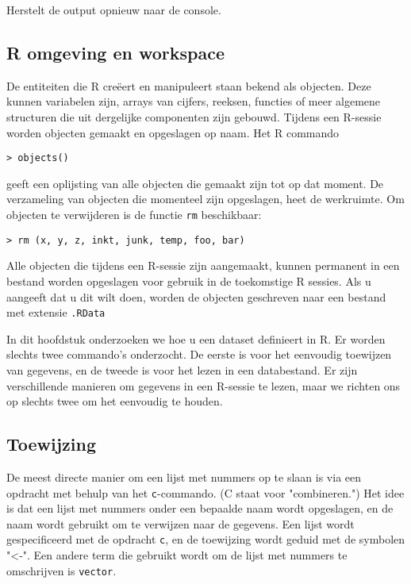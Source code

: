 Herstelt de output opnieuw naar de console.

\subsection{R omgeving en workspace}

De entiteiten die R creëert en manipuleert staan bekend als objecten. Deze kunnen variabelen zijn, arrays
van cijfers, reeksen, functies of meer algemene structuren die uit dergelijke componenten zijn gebouwd.
Tijdens een R-sessie worden objecten gemaakt en opgeslagen op naam. Het R commando

\begin{lstlisting}
> objects()
\end{lstlisting}

geeft een oplijsting van alle objecten die gemaakt zijn tot op dat moment.
De verzameling van objecten die momenteel zijn opgeslagen, heet de werkruimte.
Om objecten te verwijderen is de functie \texttt{rm} beschikbaar:

\begin{lstlisting}
> rm (x, y, z, inkt, junk, temp, foo, bar)
\end{lstlisting}

Alle objecten die tijdens een R-sessie zijn aangemaakt, kunnen permanent in een bestand worden opgeslagen voor gebruik in de toekomstige
R sessies. Als u aangeeft dat u dit wilt doen, worden de objecten geschreven naar een bestand met extensie \texttt{.RData}

In dit hoofdstuk onderzoeken we hoe u een dataset definieert in R. Er worden slechts twee commando's onderzocht. De eerste is voor het eenvoudig toewijzen van gegevens, en de tweede is voor het lezen in een databestand. Er zijn verschillende manieren om gegevens in een R-sessie te lezen, maar we richten ons op slechts twee om het eenvoudig te houden.

\subsection{Toewijzing}

De meest directe manier om een lijst met nummers op te slaan is via een opdracht met behulp van het \texttt{c}-commando. (C staat voor "combineren.") Het idee is dat een lijst met nummers onder een bepaalde naam wordt opgeslagen, en de naam wordt gebruikt om te verwijzen naar de gegevens. Een lijst wordt gespecificeerd met de opdracht \texttt{c}, en de toewijzing wordt geduid met de symbolen "<-". Een andere term die gebruikt wordt om de lijst met nummers te omschrijven is \texttt{vector}.

